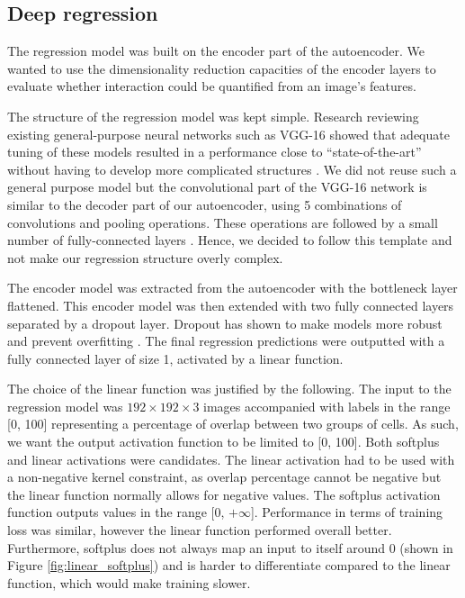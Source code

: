 \subsection{Deep regression}

The regression model was built on the encoder part of the autoencoder. We wanted to use the dimensionality reduction capacities of the encoder layers to evaluate whether interaction could be quantified from an image's features.

The structure of the regression model was kept simple. Research reviewing existing general-purpose neural networks such as VGG-16 showed that adequate tuning of these models resulted in a performance close to ``state-of-the-art'' without having to develop more complicated structures \citep{Lathu2018}. We did not reuse such a general purpose model but the convolutional part of the VGG-16 network is similar to the decoder part of our autoencoder, using 5 combinations of convolutions and pooling operations. These operations are followed by a small number of fully-connected layers \citep{Simonyan15}. Hence, we decided to follow this template and not make our regression structure overly complex.

The encoder model was extracted from the autoencoder with the bottleneck layer flattened. This encoder model was then extended with two fully connected layers separated by a dropout layer. Dropout has shown to make models more robust and prevent overfitting \citep{hinton_improving_2012}. The final regression predictions were outputted with a fully connected layer of size 1, activated by a linear function.

The choice of the linear function was justified by the following. The input to the regression model was $192\times192\times3$ images accompanied with labels in the range [0, 100] representing a percentage of overlap between two groups of cells. As such, we want the output activation function to be limited to [0, 100]. Both softplus and linear activations were candidates. The linear activation had to be used with a non-negative kernel constraint, as overlap percentage cannot be negative but the linear function normally allows for negative values. The softplus activation function outputs values in the range [0, $+\infty$]. Performance in terms of training loss was similar, however the linear function performed overall better. Furthermore, softplus does not always map an input to itself around 0 (shown in Figure \ref{fig:linear_softplus}) and is harder to differentiate compared to the linear function, which would make training slower.  


